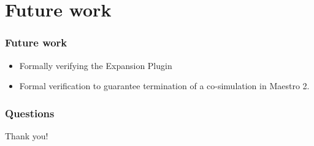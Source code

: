 \documentclass{beamer}
\begin{document}
\section{Future work}

\begin{frame}
\frametitle{Future work}
\begin{itemize}
    \item Formally verifying the Expansion Plugin  
    \item Formal verification to guarantee termination of a co-simulation in Maestro 2.
\end{itemize}
\end{frame}

\begin{frame}
\frametitle{Questions}
\huge
Thank you!
\end{frame}
\end{document}
